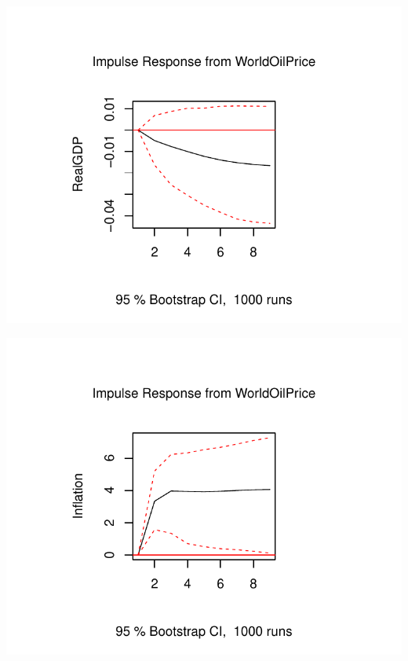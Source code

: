 \documentclass[11pt,preprint, authoryear]{elsarticle}
\numberwithin{equation}{section}
\numberwithin{figure}{section}
\numberwithin{table}{section}
\begin{document}
\begin{center}\includegraphics{README_files/figure-latex/unnamed-chunk-6-3} \end{center}

\begin{center}\includegraphics{README_files/figure-latex/unnamed-chunk-6-4} \end{center}
\end{document}
